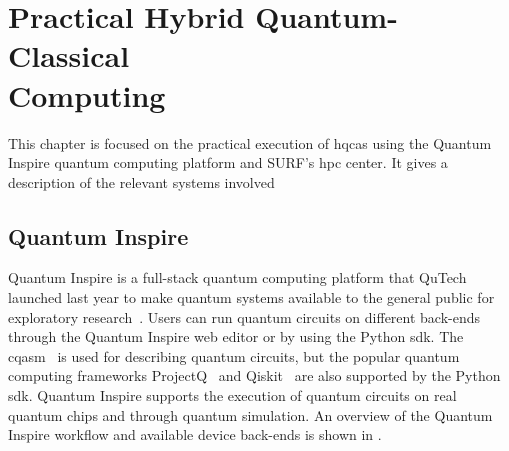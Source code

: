 \chapter[Practical Hybrid Quantum-Classical Computing]{Practical Hybrid Quantum-Classical\\Computing} \label{chap:practical-hybrid-quantum-classical-computing}
This chapter is focused on the practical execution of \glspl{hqca} using the Quantum Inspire quantum computing platform and SURF's \gls{hpc} center.
It gives a description of the relevant systems involved

\section{Quantum Inspire}
Quantum Inspire is a full-stack quantum computing platform that QuTech launched last year to make quantum systems available to the general public for exploratory research~\cite{last2020quantum}.
Users can run quantum circuits on different back-ends through the Quantum Inspire web editor or by using the Python \gls{sdk}.
The \gls{cqasm}~\cite{khammassi2018cqasm} is used for describing quantum circuits, but the popular quantum computing frameworks ProjectQ~\cite{steiger2018projectq} and Qiskit~\cite{qiskit} are also supported by the Python \gls{sdk}.
Quantum Inspire supports the execution of quantum circuits on real quantum chips and through quantum simulation.
An overview of the Quantum Inspire workflow and available device back-ends is shown in .

